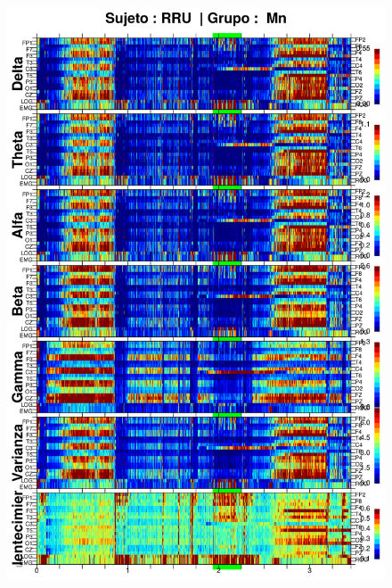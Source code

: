 \begin{figure}
\centering
\includegraphics[width=0.9\linewidth]
{./enlentecimiento/RRMNS_espectral_total.png}
\end{figure}

